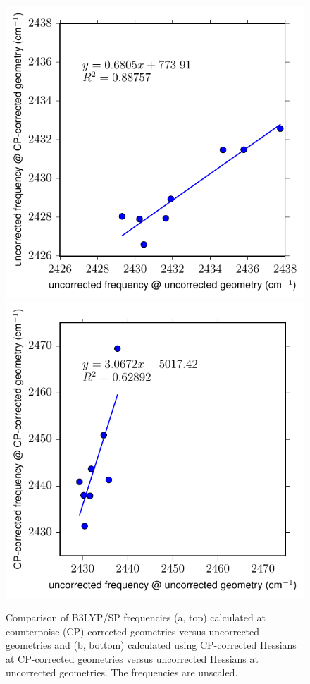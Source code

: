 \documentclass[%
  class = book,%
  crop = false,%
  float = true,%
  multi = true,%
  preview = false,%
]{standalone}
\begin{document}
\begin{figure}
  \centering
  \includegraphics[scale=0.91]{Fig3a.pdf}
  \includegraphics[scale=0.91]{Fig3b.pdf}
  \caption[Correlation of \texorpdfstring{ \(\nu_3\)}{carbon dioxide asymmetric stretch} frequencies with CP corrections]{Comparison of B3LYP/SP frequencies (a, top) calculated at counterpoise (CP) corrected geometries versus uncorrected geometries and (b, bottom) calculated using CP-corrected Hessians at CP-corrected geometries versus uncorrected Hessians at uncorrected geometries. The frequencies are unscaled.}
  \label{paper_02:fig:3}
\end{figure}
\end{document}
